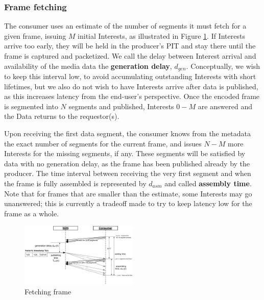 \documentclass{icn/sig-alternate-2013} %
\begin{document}
\subsubsection{Frame fetching}

The consumer uses an estimate of the number of segments it must fetch for a given frame, issuing $M$ initial Interests, as illustrated in Figure \ref{fig:pull}. If Interests arrive too early, they will be held in the producer's PIT and stay there until the frame is captured and packetized. We call the delay between Interest arrival and availability of the media data the \textbf{generation delay}, $d_{gen}$. Conceptually, we wish to keep this interval low, to avoid accumulating outstanding Interests with short lifetimes, but we also do not wish to have Interests arrive after data is published, as this increases latency from the end-user's perspective.  Once the encoded frame is segmented into $N$ segments and published, Interests $0 - M$ are answered and the Data returns to the requestor(s). 

Upon receiving the first data segment, the consumer knows from the metadata the exact number of segments for the current frame, and issues $N - M$ more Interests for the missing segments, if any. These segments will be satisfied by data with no generation delay, as the frame has been published already by the producer. The time interval between receiving the very first segment and when the frame is fully assembled is represented by $d_{asm}$ and called \textbf{assembly time}. Note that for frames that are smaller than the estimate, some Interests may go unanswered; this is currently a tradeoff made to try to keep latency low for the frame as a whole. %
 

\begin{figure}[t!]
\centering
\includegraphics[width=0.5\textwidth]{frame-fetch}
\vspace{-18pt}
\caption{Fetching frame}
\label{fig:pull}
\end{figure}
\end{document}
